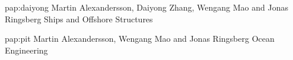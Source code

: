 \documentclass[12pt,a4paper,twoside,openright,pdftex]{book}
\begin{document}
      
      { }
      {pap:daiyong}
      {Martin Alexandersson, Daiyong Zhang, Wengang Mao and Jonas Ringsberg}
      {Ships and Offshore Structures}
      {}
      { }
      
      { }
      {pap:pit}
      {Martin Alexandersson, Wengang Mao and Jonas Ringsberg}
      {Ocean Engineering}
      {}
      { }
\end{document}
